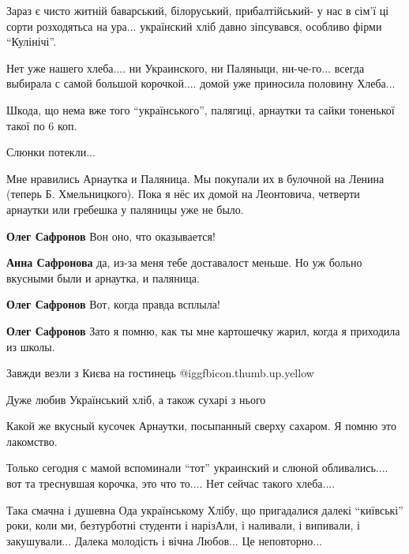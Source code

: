 \begin{itemize}

Зараз є чисто житній баварський, білоруський, прибалтійський- у нас в сім'ї ці
сорти розходятьса на ура... українский хліб давно зіпсувався, особливо фірми
\enquote{Кулінічі}.


Нет уже нашего хлеба.... ни Украинского, ни Паляныци, ни-че-го... всегда
выбирала с самой большой корочкой.... домой уже приносила половину Хлеба...


Шкода, що нема вже того \enquote{українського}, палягиці, арнаутки та сайки
тоненької такої по 6 коп.

Слюнки потекли...


Мне нравились Арнаутка и Паляница. Мы покупали их в булочной на Ленина (теперь
Б. Хмельницкого). Пока я нёс их домой на Леонтовича, четверти арнаутки или
гребешка у паляницы уже не было.

\begin{itemize} %
\textbf{Олег Сафронов} Вон оно, что оказывается!

\textbf{Анна Сафронова} да, из-за меня тебе доставалост меньше. Но уж больно вкусными были и арнаутка, и паляница.

\textbf{Олег Сафронов} Вот, когда правда всплыла!

\textbf{Олег Сафронов} Зато я помню, как ты мне картошечку жарил, когда я приходила из школы.
\end{itemize} %


Завжди везли з Києва на гостинець @igg{fbicon.thumb.up.yellow} 

Дуже любив Український хліб, а також сухарі з нього


Какой же вкусный кусочек Арнаутки, посыпанный сверху сахаром. Я помню это
лакомство.


Только сегодня с мамой вспоминали \enquote{тот} украинский и слюной
обливались.... вот та треснувшая корочка, это что то.... Нет сейчас такого
хлеба....


Така смачна і душевна Ода українському Хлібу, що пригадалися
далекі \enquote{київські} роки, коли ми, безтурботні студенти і нарізАли, і наливали, і
випивали, і закушували... Далека молодість і вічна Любов... Це неповторно...


\end{itemize}
